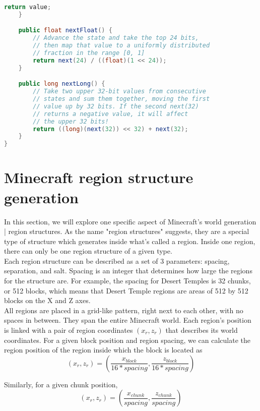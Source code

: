 \documentclass{article}
\begin{document}
\begin{lstlisting}[language=Java]
        return value;
    }

    public float nextFloat() {
        // Advance the state and take the top 24 bits, 
        // then map that value to a uniformly distributed 
        // fraction in the range [0, 1]
        return next(24) / ((float)(1 << 24));
    }

    public long nextLong() {
        // Take two upper 32-bit values from consecutive 
        // states and sum them together, moving the first 
        // value up by 32 bits. If the second next(32) 
        // returns a negative value, it will affect 
        // the upper 32 bits!
        return ((long)(next(32)) << 32) + next(32);
    }
}
\end{lstlisting}

\section{Minecraft region structure generation}\label{appendix.regionstructures}

In this section, we will explore one specific aspect of Minecraft's world generation | region structures.
As the name "region structures" suggests, they are a special type of structure which generates inside what's called a region. Inside one region, there can only be one region structure of a given type.\\
Each region structure can be described as a set of 3 parameters: spacing, separation, and salt. Spacing is an integer that determines how large the regions for the structure are. For example, the spacing for Desert Temples is 32 chunks, or 512 blocks, which means that Desert Temple regions are areas of 512 by 512 blocks on the X and Z axes. \\
All regions are placed in a grid-like pattern, right next to each other, with no spaces in between. They span the entire Minecraft world. Each region's position is linked with a pair of region coordinates $(x_r, z_r)$ that describes its world coordinates. For a given block position and region spacing, we can calculate the region position of the region inside which the block is located as
\begin{equation}
    (x_r, z_r) = (\frac{x_{block}}{16 * spacing}, \frac{z_{block}}{16 * spacing})
\end{equation}

\noindent Similarly, for a given chunk position,
\begin{equation}
    (x_r, z_r) = (\frac{x_{chunk}}{spacing}, \frac{z_{chunk}}{spacing})
\end{equation}
\end{document}
